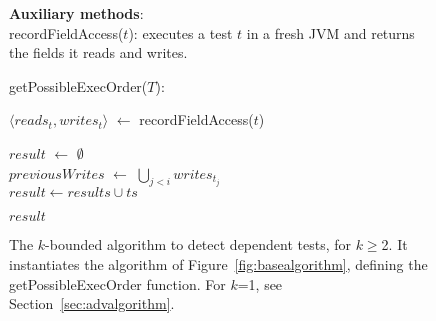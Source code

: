 \begin{figure}[t]
\textbf{Auxiliary methods}:\\
recordFieldAccess($\mathit{t}$): executes a test $\mathit{t}$ in
a fresh JVM and returns the fields it reads and writes.\\


\vspace{-2mm}

getPossibleExecOrder($T$):\\
\vspace{-5mm}
\begin{algorithmic}[1]
\STATE $\langle \mathit{reads}_t, \mathit{writes}_t\rangle$ $\leftarrow$ recordFieldAccess($\mathit{t}$)\\ 
\ENDFOR

\STATE $\mathit{result}$ $\leftarrow$ $\emptyset$ \\
		\STATE $\mathit{previousWrites}$ $\leftarrow$ $\bigcup_{\mathit{j} < \mathit{i}}  \mathit{writes}_{t_j} $ \\
			\STATE $\mathit{result} \leftarrow \mathit{results} \cup \mathit{ts}$
		\ENDIF
	\ENDFOR

\ENDFOR
\RETURN $\mathit{result}$
\end{algorithmic}

\vspace{-3mm}
\caption {The \dependenceaware{} $k$-bounded algorithm to detect dependent tests,
  for $k$$\ge$2.
It instantiates the algorithm of Figure~\ref{fig:basealgorithm}, defining the
getPossibleExecOrder function.
For $k$=1, see Section~\ref{sec:advalgorithm}.
} 
\label{fig:impralg}
\end{figure}



